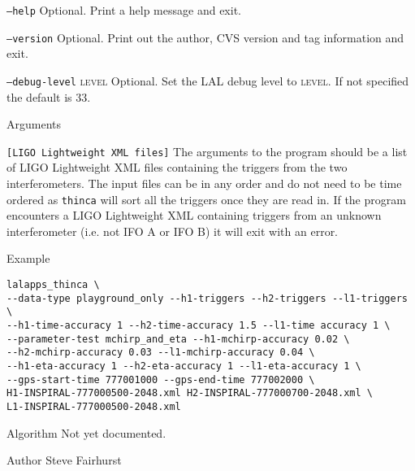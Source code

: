 \begin{entry}
\begin{entry}
\item[\texttt{--help}] Optional.  Print a help message and exit.

\item[\texttt{--version}] Optional.  Print out the author, CVS version and
tag information and exit.

\item[\texttt{--debug-level} \textsc{level}] Optional. Set the LAL debug
level to \textsc{level}. If not specified the default is 33.

\end{entry}

\item[Arguments]\leavevmode
\begin{entry}
\item[\texttt{[LIGO Lightweight XML files]}] The arguments to the program
should be a list of LIGO Lightweight XML files containing the triggers from
the two interferometers. The input files can be in any order and do not need
to be time ordered as \texttt{thinca} will sort all the triggers once they are
read in. If the program encounters a LIGO Lightweight XML containing triggers
from an unknown interferometer (i.e. not IFO A or IFO B) it will exit with an
error.
\end{entry}

\item[Example]
\begin{verbatim}
lalapps_thinca \
--data-type playground_only --h1-triggers --h2-triggers --l1-triggers \
--h1-time-accuracy 1 --h2-time-accuracy 1.5 --l1-time accuracy 1 \
--parameter-test mchirp_and_eta --h1-mchirp-accuracy 0.02 \
--h2-mchirp-accuracy 0.03 --l1-mchirp-accuracy 0.04 \ 
--h1-eta-accuracy 1 --h2-eta-accuracy 1 --l1-eta-accuracy 1 \
--gps-start-time 777001000 --gps-end-time 777002000 \
H1-INSPIRAL-777000500-2048.xml H2-INSPIRAL-777000700-2048.xml \
L1-INSPIRAL-777000500-2048.xml
\end{verbatim}

\item[Algorithm]
Not yet documented.


\item[Author] 
Steve Fairhurst
\end{entry}


